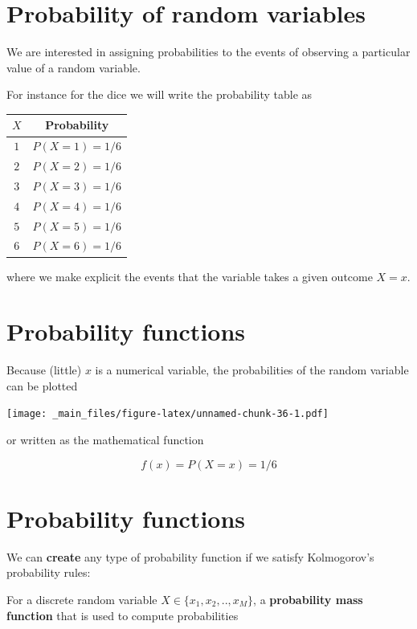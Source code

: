 \documentclass[
]{book}
\begin{document}
\hypertarget{probability-of-random-variables}{%
\section{Probability of random variables}\label{probability-of-random-variables}}

We are interested in assigning probabilities to the events of observing a particular value of a random variable.

For instance for the dice we will write the probability table as

\begin{longtable}[]{@{}cc@{}}
\toprule\noalign{}
\(X\) & Probability \\
\midrule\noalign{}
\endhead
\bottomrule\noalign{}
\endlastfoot
\(1\) & \(P(X=1)=1/6\) \\
\(2\) & \(P(X=2)=1/6\) \\
\(3\) & \(P(X=3)=1/6\) \\
\(4\) & \(P(X=4)=1/6\) \\
\(5\) & \(P(X=5)=1/6\) \\
\(6\) & \(P(X=6)=1/6\) \\
\end{longtable}

where we make explicit the events that the variable takes a given outcome \(X=x\).

\hypertarget{probability-functions}{%
\section{Probability functions}\label{probability-functions}}

Because (little) \(x\) is a numerical variable, the probabilities of the random variable can be plotted

\texttt{[image: \_main\_files/figure-latex/unnamed-chunk-36-1.pdf]}

or written as the mathematical function

\[f(x)=P(X=x)=1/6\]

\hypertarget{probability-functions-1}{%
\section{Probability functions}\label{probability-functions-1}}

We can \textbf{create} any type of probability function if we satisfy Kolmogorov's probability rules:

For a discrete random variable \(X \in \{x_1 , x_2 , .. , x_M\}\), a \textbf{probability mass function} that is used to compute probabilities
\end{document}
